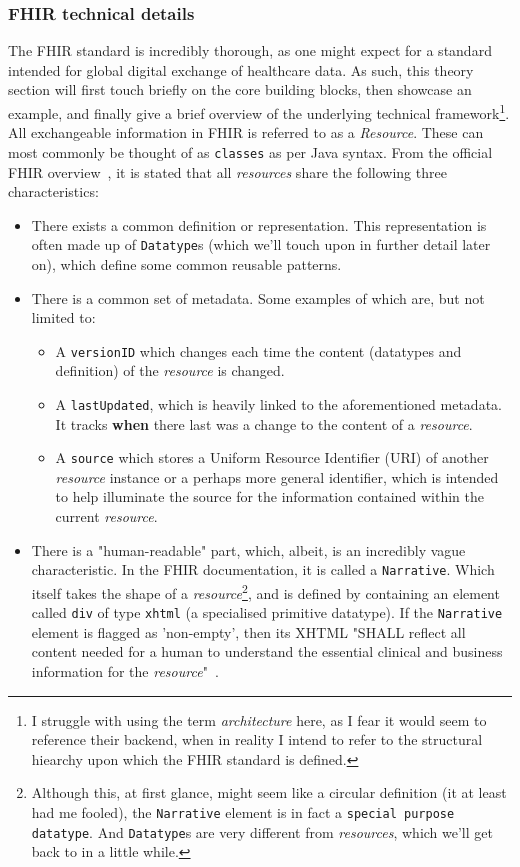 \subsubsection*{FHIR technical details}
The FHIR standard is incredibly thorough, as one might expect for a standard intended for global digital exchange of healthcare data. As such, this theory section will first touch briefly on the core building blocks, then showcase an example, and finally give a brief overview of the underlying technical framework\footnote{I struggle with using the term \emph{architecture} here, as I fear it would seem to reference their backend, when in reality I intend to refer to the structural hiearchy upon which the FHIR standard is defined.}.
\\ 
All exchangeable information in FHIR is referred to as a \emph{Resource}. These can most commonly be thought of as \texttt{classes} as per Java syntax. From the official FHIR overview~\cite{FHIR-overview}, it is stated that all \emph{resources} share the following three characteristics:
\begin{itemize}
	\item There exists a common definition or representation. This representation is often made up of \texttt{Datatype}s (which we'll touch upon in further detail later on), which define some common reusable patterns.
	\item There is a common set of metadata. Some examples of which are, but not limited to:
	\begin{itemize}
		\item A \texttt{versionID} which changes each time the content (datatypes and definition) of the \emph{resource} is changed.
		\item  A \texttt{lastUpdated}, which is heavily linked to the aforementioned metadata. It tracks \textbf{when} there last was a change to the content of a \emph{resource}.
		\item A \texttt{source} which stores a Uniform Resource Identifier (URI) of another \emph{resource} instance or a perhaps more general identifier, which is intended to help illuminate the source for the information contained within the current \emph{resource}. 
	\end{itemize}
	\item There is a "human-readable" part, which, albeit, is an incredibly vague characteristic. In the FHIR documentation, it is called a \texttt{Narrative}. Which itself takes the shape of a \emph{resource}\footnote{Although this, at first glance, might seem like a circular definition (it at least had me fooled), the \texttt{Narrative} element is in fact a \texttt{special purpose datatype}. And \texttt{Datatype}s are very different from \emph{resources}, which we'll get back to in a little while.}, and is defined by containing an element called \texttt{div} of type \texttt{xhtml} (a specialised primitive datatype). If the \texttt{Narrative} element is flagged as 'non-empty', then its XHTML "SHALL reflect all content needed for a human to understand the essential clinical and business information for the \emph{resource}"~\cite{FHIR-Narrative}.
\end{itemize}

